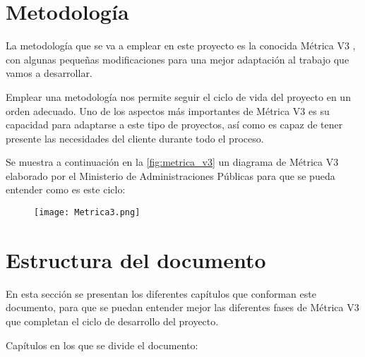 \section{Metodología}
La metodología que se va a emplear en este proyecto es la conocida Métrica V3 \cite{portal_administracion_electronica_metrica_nodate}, con algunas pequeñas modificaciones para una mejor adaptación al trabajo que vamos a desarrollar.

Emplear una metodología nos permite seguir el ciclo de vida del proyecto en un orden adecuado. Uno de los aspectos más importantes de Métrica V3 es su capacidad para adaptarse a este tipo de proyectos, así como es capaz de tener presente  las necesidades del cliente durante todo el proceso.

Se muestra a continuación en la \autoref{fig:metrica_v3} un diagrama de Métrica V3 elaborado por el Ministerio de Administraciones Públicas para que se pueda entender como es este ciclo:

\begin{figure}[H]
	{\texttt{[image: Metrica3.png]}}
\end{figure}

\section{Estructura del documento}
En esta sección se presentan los diferentes capítulos que conforman este documento, para que se puedan entender mejor las diferentes fases de Métrica V3 que completan el ciclo de desarrollo del proyecto. 

Capítulos en los que se divide el documento:

